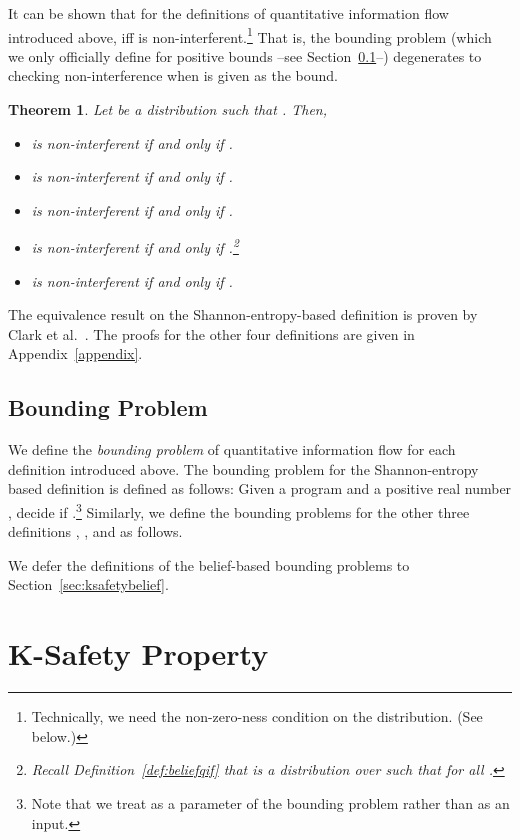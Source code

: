 \documentclass{llncs}
\newtheorem{theorem}{Theorem}[section]
\begin{document}
It can be shown that for the definitions of quantitative information
flow  introduced above,  iff 
is non-interferent.\footnote{Technically, we need the non-zero-ness
  condition on the distribution.  (See below.)}  That is, the bounding
problem (which we only officially define for positive bounds --see
Section~\ref{sec:boundprob}--) degenerates to checking
non-interference when  is given as the bound.

\begin{theorem}
\label{thm:nonint}
Let  be a distribution such that .  Then,
\begin{itemize}
\item  is non-interferent if and only if .
\item  is non-interferent if and only if .
\item  is non-interferent if and only if .
\item  is non-interferent if and only if .\footnote{Recall Definition~\ref{def:beliefqif} that  is a distribution over  such that  for all .}
\item  is non-interferent if and only if .
\end{itemize}
\end{theorem}
The equivalence result on the Shannon-entropy-based definition is
proven by Clark et al.~\cite{clark05}.  The proofs for the other four
definitions are given in Appendix~\ref{appendix}.

\subsection{Bounding Problem}

\label{sec:boundprob}

We define the {\em bounding problem} of quantitative information flow
for each definition introduced above.  The bounding problem for the
Shannon-entropy based definition  is defined as
follows: Given a program  and a positive real number , decide if
.\footnote{Note that we treat  as a
    parameter of the bounding problem rather than as an input.}
Similarly, we define the bounding problems for the other three
definitions , , and  as
follows.

We defer the definitions of the belief-based bounding problems to 
Section~\ref{sec:ksafetybelief}.
\section{K-Safety Property}

\label{sec:ksafety}
\end{document}
